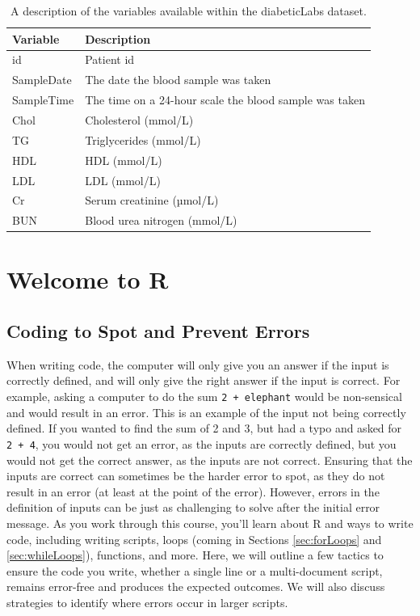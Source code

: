 \documentclass[
]{book}
\begin{document}
\begin{table}

\caption{\label{tab:diabeticLabs}A description of the variables available within the diabeticLabs dataset.}
\centering
\begin{tabular}[t]{l|l}
\hline
Variable & Description\\
\hline
id & Patient id\\
\hline
SampleDate & The date the blood sample was taken\\
\hline
SampleTime & The time on a 24-hour scale the blood sample was taken\\
\hline
Chol & Cholesterol (mmol/L)\\
\hline
TG & Triglycerides (mmol/L)\\
\hline
HDL & HDL (mmol/L)\\
\hline
LDL & LDL (mmol/L)\\
\hline
Cr & Serum creatinine (µmol/L)\\
\hline
BUN & Blood urea nitrogen (mmol/L)\\
\hline
\end{tabular}
\end{table}

\chapter{Welcome to R}\label{ch-1}

\section{Coding to Spot and Prevent Errors}\label{coding-to-spot-and-prevent-errors}

When writing code, the computer will only give you an answer if the input is correctly defined, and will only give the right answer if the input is correct.
For example, asking a computer to do the sum \texttt{2\ +\ elephant} would be non-sensical and would result in an error.
This is an example of the input not being correctly defined.
If you wanted to find the sum of 2 and 3, but had a typo and asked for \texttt{2\ +\ 4}, you would not get an error, as the inputs are correctly defined, but you would not get the correct answer, as the inputs are not correct.
Ensuring that the inputs are correct can sometimes be the harder error to spot, as they do not result in an error (at least at the point of the error).
However, errors in the definition of inputs can be just as challenging to solve after the initial error message.
As you work through this course, you'll learn about R and ways to write code, including writing scripts, loops (coming in Sections \ref{sec:forLoops} and \ref{sec:whileLoops}), functions, and more.
Here, we will outline a few tactics to ensure the code you write, whether a single line or a multi-document script, remains error-free and produces the expected outcomes.
We will also discuss strategies to identify where errors occur in larger scripts.
\end{document}
